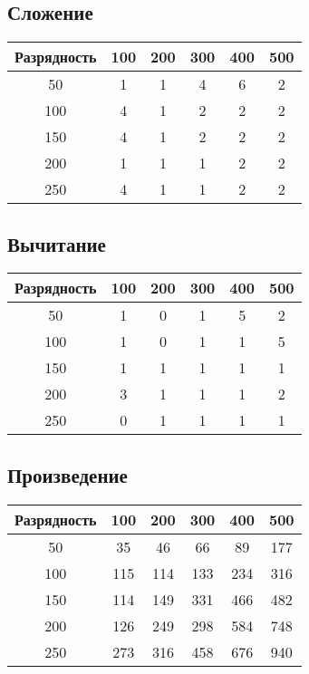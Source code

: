 \documentclass[a4paper]{article}
\begin{document}
\subsection{Сложение}
\begin{center}
\begin{tabular}{ |c|c|c|c|c|c|}
\hline
Разрядность & 100 & 200 & 300 & 400 & 500 \\ 
\hline
50 & 1 & 1 & 4 & 6 & 2\\  
100 & 4 & 1 & 2 & 2 & 2\\  
150 & 4 & 1 & 2 & 2 & 2\\
200 & 1 & 1 & 1 & 2 & 2\\  
250 & 4 & 1 & 1 & 2 & 2\\
\hline
\end{tabular}
\end{center}

\subsection{Вычитание}
\begin{center}
\begin{tabular}{ |c|c|c|c|c|c|}
\hline
Разрядность & 100 & 200 & 300 & 400 & 500 \\ 
\hline
50 & 1 & 0 & 1 & 5 & 2\\  
100 & 1 & 0 & 1 & 1 & 5\\  
150 & 1 & 1 & 1 & 1 & 1\\
200 & 3 & 1 & 1 & 1 & 2\\  
250 & 0 & 1 & 1 & 1 & 1\\
\hline
\end{tabular}
\end{center}

\subsection{Произведение}
\begin{center}
\begin{tabular}{ |c|c|c|c|c|c|}
\hline
Разрядность & 100 & 200 & 300 & 400 & 500 \\ 
\hline
50 & 35 & 46 & 66 & 89 & 177\\  
100 & 115 & 114 & 133 & 234 & 316\\  
150 & 114 & 149 & 331 & 466 & 482\\
200 & 126 & 249 & 298 & 584 & 748\\  
250 & 273 & 316 & 458 & 676 & 940\\
\hline
\end{tabular}
\end{center}
\end{document}
